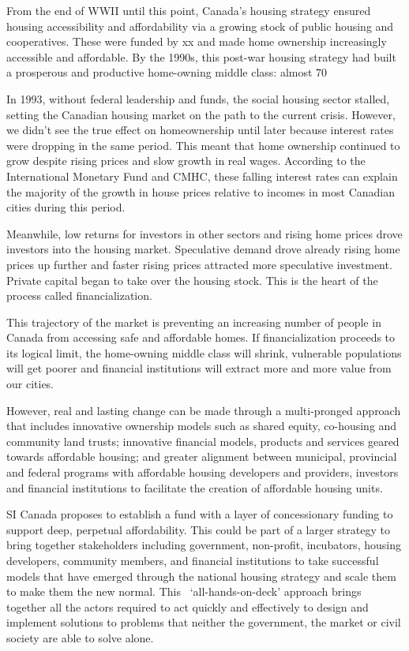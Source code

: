 From the end of WWII until this point, Canada's housing strategy ensured housing accessibility and affordability via a growing stock of public housing and cooperatives. These were funded by xx and made home ownership increasingly accessible and affordable. By the 1990s, this post-war housing strategy had built a prosperous and productive home-owning middle class: almost 70%

In 1993, without federal leadership and funds, the social housing sector stalled, setting the Canadian housing market on the path to the current crisis. However, we didn't see the true effect on homeownership until later because interest rates were dropping in the same period. This meant that home ownership continued to grow despite rising prices and slow growth in real wages. According to the International Monetary Fund and CMHC, these falling interest rates can explain the majority of the growth in house prices relative to incomes in most Canadian cities during this period. 

Meanwhile, low returns for investors in other sectors and rising home prices drove investors into the housing market. Speculative demand drove already rising home prices up further and faster rising prices attracted more speculative investment. Private capital began to take over the housing stock. This is the heart of the process called financialization. 

This trajectory of the market is preventing an increasing number of people in Canada from accessing safe and affordable homes. If financialization proceeds to its logical limit, the home-owning middle class will shrink, vulnerable populations will get poorer and financial institutions will extract more and more value from our cities.

However, real and lasting change can be made through a multi-pronged approach that includes innovative ownership models such as shared equity, co-housing and community land trusts; innovative financial models, products and services geared towards affordable housing; and greater alignment between municipal, provincial and federal programs with affordable housing developers and providers, investors and financial institutions to facilitate the creation of affordable housing units.

SI Canada proposes to establish a fund with a layer of concessionary funding to support deep, perpetual affordability. This could be part of a larger strategy to bring together stakeholders including government, non-profit, incubators, housing developers, community members, and financial institutions to take successful models that have emerged through the national housing strategy and scale them to make them the new normal. This  `all-hands-on-deck' approach brings together all the actors required to act quickly and effectively to design and implement solutions to problems that neither the government, the market or civil society are able to solve alone.  

